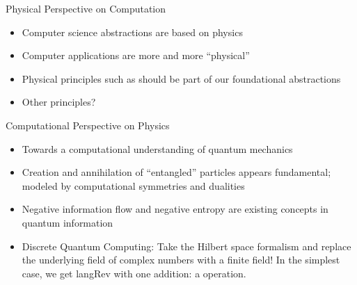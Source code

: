 \documentclass[11pt]{beamer}
\newcommand{\red}[1]{{\color{red}{#1}}}
\newcommand{\blue}[1]{{\color{blue}{#1}}}
\begin{document}
\begin{frame}{Physical Perspective on Computation}

\begin{itemize}

  \vfill\item Computer science abstractions are based on \blue{old}
  physics

  \vfill\item Computer applications are more and more ``physical''

  \vfill\item Physical principles such as \red{conservation of
    information} should be part of our foundational abstractions

  \vfill\item Other principles?

\end{itemize} 

\vfill

\end{frame}

\begin{frame}{Computational Perspective on Physics}

\begin{itemize}

  \vfill\item Towards a computational understanding of quantum mechanics

  \vfill\item Creation and annihilation of ``entangled'' particles
  appears fundamental; modeled by computational symmetries and
  dualities

  \vfill\item Negative information flow and negative entropy are
  existing concepts in quantum information

  \vfill\item Discrete Quantum Computing: Take the Hilbert space
  formalism and replace the underlying field of \red{uncomputable}
  complex numbers with a finite field! In the simplest case, we get
  {{langRev}} with one addition: a \red{disjoint union} operation.

\end{itemize} 

\vfill

\end{frame}

\end{document}
